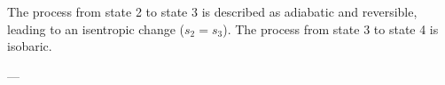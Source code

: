 The process from state 2 to state 3 is described as adiabatic and reversible, leading to an isentropic change (\(s_2 = s_3\)). The process from state 3 to state 4 is isobaric.

---